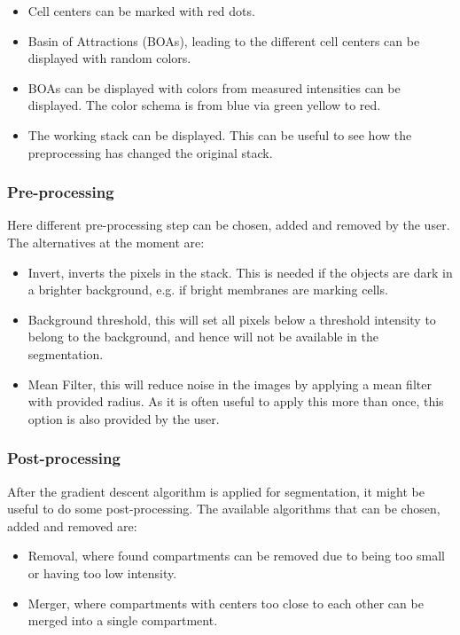 \documentclass[a4paper,12pt]{article}
\begin{document}
\begin{itemize}
%
\item Cell centers can be marked with red dots.
%
\item Basin of Attractions (BOAs), leading to the different cell centers can be
	displayed with random colors.
%
\item BOAs can be displayed with colors from measured intensities can be
	displayed. The color schema is from blue via green yellow to red.
%
\item The working stack can be displayed. This can be useful to see how the
	preprocessing has changed the original stack.
%
\end{itemize}

\subsubsection{Pre-processing}

Here different pre-processing step can be chosen, added and removed by the
user. The alternatives at the moment are:

\begin{itemize}
%
\item Invert, inverts the pixels in the stack. This is needed if the objects
	are dark in a brighter background, e.g. if bright membranes are marking
	cells.
%
\item Background threshold, this will set all pixels below a threshold
	intensity to belong to the background, and hence will not be available in
	the segmentation.
%
\item Mean Filter, this will reduce noise in the images by applying a mean
	filter with provided radius. As it is often useful to apply this more than
	once, this option is also provided by the user.
%
\end{itemize}

\subsubsection{Post-processing}

After the gradient descent algorithm is applied for segmentation, it might be
useful to do some post-processing. The available algorithms that can be
chosen, added and removed are:

\begin{itemize} 
%
\item Removal, where found compartments can be removed due to being too small
	or having too low intensity.
%
\item Merger, where compartments with centers too close to each other can be
	merged into a single compartment.
%
\end{itemize}
\end{document}
